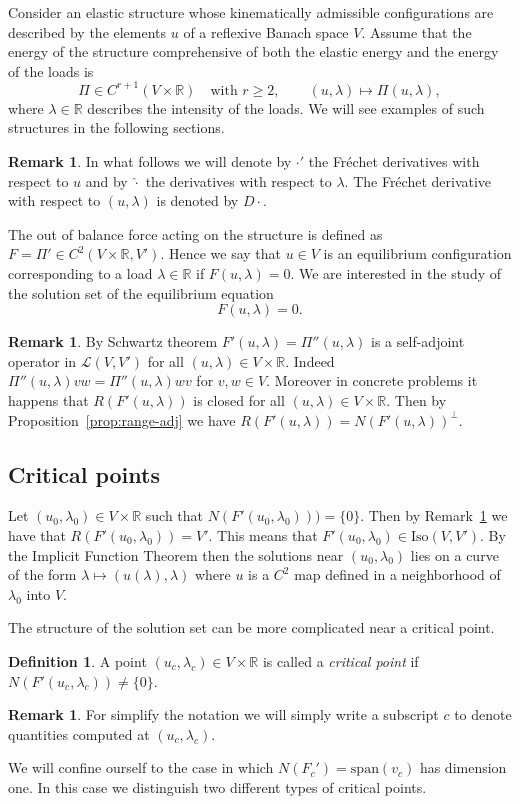 \documentclass[a4paper,11pt]{article}
\theoremstyle{definition}
\newtheorem{defi}[prop]{Definition}
\newtheorem{rmk}[prop]{Remark}
\begin{document}
Consider an elastic structure whose kinematically admissible configurations are described by the elements $u$ of a reflexive Banach space $V$. Assume that the energy of the structure comprehensive of both the elastic energy and the energy of the loads is
\[
\Pi\in C^{r+1}(V\times\mathbb{R})\quad\text{with $r\ge2$},\qquad(u,\lambda)\mapsto\Pi(u,\lambda),
\]
where $\lambda\in\mathbb{R}$ describes the intensity of the loads. We will see examples of such structures in the following sections.

\begin{rmk}
In what follows we will denote by $\cdot'$ the Fréchet derivatives with respect to $u$ and by $\hat{\cdot}$ the derivatives with respect to $\lambda$. The Fréchet derivative with respect to $(u,\lambda)$ is denoted by $D\cdot$.
\end{rmk}

The out of balance force acting on the structure is defined as $F=\Pi'\in C^2(V\times\mathbb{R},V')$. Hence we say that $u\in V$ is an equilibrium configuration corresponding to a load $\lambda\in\mathbb{R}$ if $F(u,\lambda)=0$. We are interested in the study of the solution set of the equilibrium equation
\[
F(u,\lambda)=0.
\]

\begin{rmk}
\label{rmk:adj}
By Schwartz theorem $F'(u,\lambda)=\Pi''(u,\lambda)$ is a self-adjoint operator in $\mathscr{L}(V,V')$ for all $(u,\lambda)\in V\times\mathbb{R}$. Indeed $\Pi''(u,\lambda)vw=\Pi''(u,\lambda)wv$ for $v,w\in V$. Moreover in concrete problems it happens that $R(F'(u,\lambda))$ is closed for all $(u,\lambda)\in V\times\mathbb{R}$. Then by Proposition~\ref{prop:range-adj} we have $R(F'(u,\lambda))=N(F'(u,\lambda))^\perp$.
\end{rmk}

\subsection{Critical points}
\label{subsec:critical-points}

Let $(u_0,\lambda_0)\in V\times\mathbb{R}$ such that $N(F'(u_0,\lambda_0)))=\{0\}$. Then by Remark~\ref{rmk:adj} we have that $R(F'(u_0,\lambda_0))=V'$. This means that $F'(u_0,\lambda_0)\in\text{Iso}(V,V')$. By the Implicit Function Theorem then the solutions near $(u_0,\lambda_0)$ lies on a curve of the form $\lambda\mapsto(u(\lambda),\lambda)$ where $u$ is a $C^2$ map defined in a neighborhood of $\lambda_0$ into $V$.

The structure of the solution set can be more complicated near a critical point.
\begin{defi}
A point $(u_c,\lambda_c)\in V\times\mathbb{R}$ is called a \emph{critical point} if $N(F'(u_c,\lambda_c))\neq\{0\}$.
\end{defi}
\begin{rmk}
For simplify the notation we will simply write a subscript $c$ to denote quantities computed at $(u_c,\lambda_c)$.
\end{rmk}
We will confine ourself to the case in which $N(F_c')=\text{span}(v_c)$ has dimension one. In this case we distinguish two different types of critical points.
\end{document}
